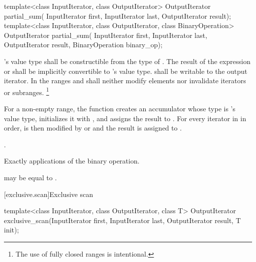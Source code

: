 %
\begin{itemdecl}
template<class InputIterator, class OutputIterator>
  OutputIterator partial_sum(
    InputIterator first, InputIterator last,
    OutputIterator result);
template<class InputIterator, class OutputIterator, class BinaryOperation>
  OutputIterator partial_sum(
    InputIterator first, InputIterator last,
    OutputIterator result, BinaryOperation binary_op);
\end{itemdecl}

\begin{itemdescr}
\pnum
\requires
{}'s value type shall be constructible
from the type of .
The result of the
expression  or 
shall be implicitly convertible to 's value type.
 shall be writable to
the  output iterator.
In the ranges  and 
 shall neither modify elements
nor invalidate iterators or subranges.%
\footnote{The use of fully closed ranges is intentional.}

\pnum
\effects
For a non-empty range,
the function creates an accumulator 
whose type is 's value type,
initializes it with ,
and assigns the result to .
For every iterator  in  in order,
 is then modified by
 or 
and the result is assigned to .

\pnum
\returns
{}.

\pnum
\complexity
Exactly  applications of the binary operation.

\pnum
\remarks
{} may be equal to .
\end{itemdescr}

[exclusive.scan]{Exclusive scan}

%
\begin{itemdecl}
template<class InputIterator, class OutputIterator, class T>
  OutputIterator exclusive_scan(InputIterator first, InputIterator last,
                                OutputIterator result, T init);
\end{itemdecl}

